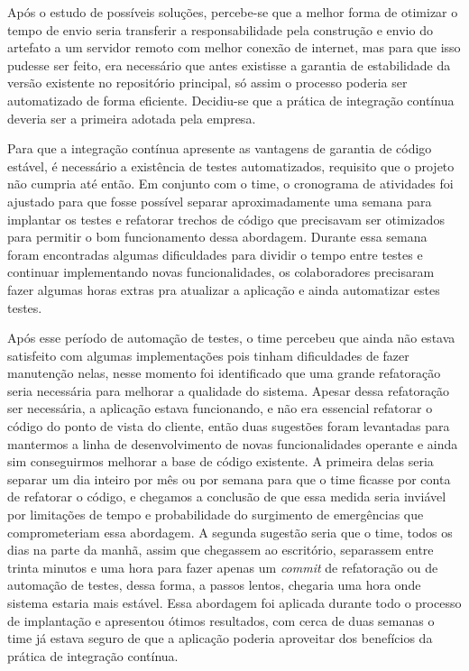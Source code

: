 \documentclass[
	12pt,				%
	openright,			%
	oneside,			%
	a4paper,			%
	english,			%
	french,				%
	spanish,			%
	brazil,				%
	]{abntex2}
\begin{document}
Após o estudo de possíveis soluções, percebe-se que a melhor forma de otimizar o tempo de envio seria transferir a responsabilidade pela construção e envio do artefato a um servidor remoto com melhor conexão de internet, mas para que isso pudesse ser feito, era necessário que antes existisse a garantia de estabilidade da versão existente no repositório principal, só assim o processo poderia ser automatizado de forma eficiente. Decidiu-se que a prática de integração contínua deveria ser a primeira adotada pela empresa.

Para que a integração contínua apresente as vantagens de garantia de código estável, é necessário a existência de testes automatizados, requisito que o projeto não cumpria até então. Em conjunto com o time, o cronograma de atividades foi ajustado para que fosse possível separar aproximadamente uma semana para implantar os testes e refatorar trechos de código que precisavam ser otimizados para permitir o bom funcionamento dessa abordagem. Durante essa semana foram encontradas algumas dificuldades para dividir o tempo entre testes e continuar implementando novas funcionalidades, os colaboradores precisaram fazer algumas horas extras pra atualizar a aplicação e ainda automatizar estes testes.

Após esse período de automação de testes, o time percebeu que ainda não estava satisfeito com algumas implementações pois tinham dificuldades de fazer manutenção nelas, nesse momento foi identificado que uma grande refatoração seria necessária para melhorar a qualidade do sistema. Apesar dessa refatoração ser necessária, a aplicação estava funcionando, e não era essencial refatorar o código do ponto de vista do cliente, então duas sugestões foram levantadas para mantermos a linha de desenvolvimento de novas funcionalidades operante e ainda sim conseguirmos melhorar a base de código existente. A primeira delas seria separar um dia inteiro por mês ou por semana para que o time ficasse por conta de refatorar o código, e chegamos a conclusão de que essa medida seria inviável por limitações de tempo e probabilidade do surgimento de emergências que comprometeriam essa abordagem. A segunda sugestão seria que o time, todos os dias na parte da manhã, assim que chegassem ao escritório, separassem entre trinta minutos e uma hora para fazer apenas um \textit{commit} de refatoração ou de automação de testes, dessa forma, a passos lentos, chegaria uma hora onde sistema estaria mais estável. Essa abordagem foi aplicada durante todo o processo de implantação e apresentou ótimos resultados, com cerca de duas semanas o time já estava seguro de que a aplicação poderia aproveitar dos benefícios da prática de integração contínua.
\end{document}
